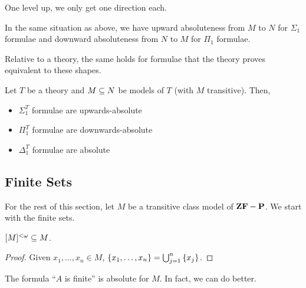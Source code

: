 One level up, we only get one direction each.

\begin{boxlemma}
    In the same situation as above, we have upward absoluteness from $M$ to $N$ for $\Sigma_1$ formulae and downward absoluteness from $N$ to $M$ for $\Pi_1$ formulae.
\end{boxlemma}

Relative to a theory, the same holds for formulae that the theory proves equivalent to these shapes.

\begin{boxlemma}
    Let $T$ be a theory and $M \subseteq N$ be models of $T$ (with $M$ transitive). Then,
    \begin{itemize}
        \item $\Sigma_1^T$ formulae are upwards-absolute
        \item $\Pi_1^T$ formulae are downwards-absolute
        \item $\Delta_1^T$ formulae are absolute
    \end{itemize}
\end{boxlemma}

\subsection{Finite Sets}

For the rest of this section, let $M$ be a transitive class model of $\mathbf{ZF} - \mathbf{P}$. We start with the finite sets.

\begin{boxlemma}
    $[M]^{< \omega} \subseteq M$.
\end{boxlemma}
\begin{proof}
    Given $x_1, \ldots, x_n \in M$, $\left\{ x_1, \ldots, x_n \right\} = \bigcup_{j=1}^{n} \left\{ x_j \right\}$.
\end{proof}

The formula ``$A$ is finite'' is absolute for $M$. In fact, we can do better.

